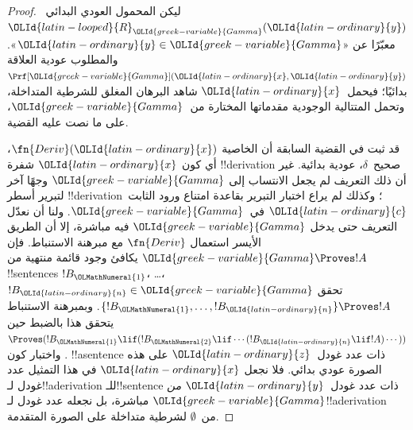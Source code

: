 \documentclass[../../../include/open-logic-section]{subfiles}
\begin{document}
\begin{proof}
ليكن المحمول العودي البدائي~${\OLId{latin-looped}{R}}_{\OLId{greek-variable}{Gamma}}({\OLId{latin-ordinary}{y}})$ معبّرًا عن
«${\OLId{latin-ordinary}{y}}\in{\OLId{greek-variable}{Gamma}}$». والمطلوب عودية العلاقة $\Prf[{\OLId{greek-variable}{Gamma}}]({\OLId{latin-ordinary}{x}},{\OLId{latin-ordinary}{y}})$ بدائيًا؛
فيحمل~${\OLId{latin-ordinary}{x}}$ شاهد البرهان المغلق للشرطية المتداخلة، وتحمل المتتالية
الوجودية مقدماتها المختارة من~${\OLId{greek-variable}{Gamma}}$، على ما نصت عليه القضية.

قد ثبت في القضية السابقة أن الخاصية $\fn{Deriv}({\OLId{latin-ordinary}{x}})$، أي كون
${\OLId{latin-ordinary}{x}}$ شفرة !!{derivation} صحيح~$\delta$، عودية بدائية. غير أن ذلك
التعريف لم يجعل الانتساب إلى ${\OLId{greek-variable}{Gamma}}$ وجهًا آخر لتبرير أسطر
!!{derivation}؛ وكذلك لم يراع اختبار التبرير بقاعدة \QR{} امتناع ورود
الثابت~${\OLId{latin-ordinary}{c}}$ في~${\OLId{greek-variable}{Gamma}}$. ولنا أن نعدّل التعريف حتى يدخل
${\OLId{greek-variable}{Gamma}}$ فيه مباشرة، إلا أن الطريق الأيسر استعمال
$\fn{Deriv}$ مع مبرهنة الاستنباط. فإن ${\OLId{greek-variable}{Gamma}}\Proves !A$ يكافئ وجود قائمة
منتهية من !!{sentence}s $!B_{\OLMathNumeral{1}}$، \dots، $!B_{\OLId{latin-ordinary}{n}}\in{\OLId{greek-variable}{Gamma}}$ تحقق
$\{!B_{\OLMathNumeral{1}},\dots,!B_{\OLId{latin-ordinary}{n}}\}\Proves !A$. وبمبرهنة الاستنباط يتحقق هذا بالضبط حين
$\Proves(!B_{\OLMathNumeral{1}}\lif(!B_{\OLMathNumeral{2}}\lif\cdots(!B_{\OLId{latin-ordinary}{n}}\lif !A)\cdots))$.
واختبار كون !!a{sentence} ذات عدد غودل~${\OLId{latin-ordinary}{z}}$ على هذه الصورة عودي بدائي.
فلا نجعل ${\OLId{latin-ordinary}{x}}$ في هذا التمثيل عدد غودل لـ!!a{derivation}
للـ!!{sentence} ذات عدد غودل~${\OLId{latin-ordinary}{y}}$ \emph{من ${\OLId{greek-variable}{Gamma}}$} مباشرة، بل نجعله
عدد غودل لـ!!a{derivation} من~$\emptyset$ لشرطية متداخلة على الصورة المتقدمة.


\end{proof}
\end{document}
